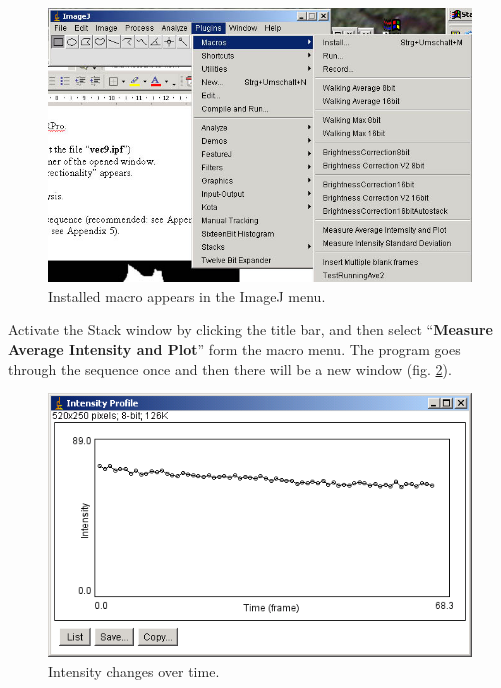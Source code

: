 \documentclass{article}
\begin{document}
\begin{figure}[!ht]
\centering
\includegraphics[scale=0.3]{img/image046.jpg}
\caption{Installed macro appears in the ImageJ menu.}
\label{fig:ijmenuMacro}
\end{figure}

Activate the Stack window by clicking the title bar, and then select
``\textbf{Measure Average Intensity and Plot}'' form the macro menu. The
program goes through the sequence once and then there will be a new
window (fig. \ref{fig:intensityTimeCourse}).


\begin{figure}[!ht]
\centering
\includegraphics[scale=0.3]{img/image048.png}
\caption{Intensity changes over time.}
\label{fig:intensityTimeCourse}
\end{figure}
\end{document}
